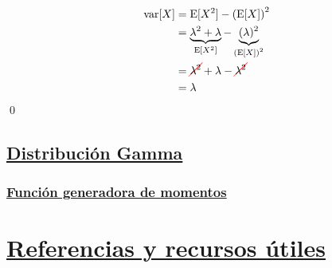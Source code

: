\documentclass[8pt]{article}
\newcommand{\Cancel}[2][black]{{\color{#1}\cancel{\color{black}#2}}} %
\begin{document}
\begin{align*}
    \text{var}[X] &= \text{E}[X^2] - \left(\text{E}[X]\right)^2 \\
    &= \underbrace{\lambda^2 + \lambda}_{\text{E}[X^2]} - \underbrace{(\lambda)^2}_{\left(\text{E}[X]\right)^2} \\
    &= \Cancel[red]{\lambda^2} + \lambda - \Cancel[red]{\lambda^2 }\\
    &= \lambda
\end{align*}\qed

\subsection*{\hyperref[subsec:distribucion_gamma_tag]{Distribución Gamma}}
\label{subsec:distribucion_gamma}

\subsubsection*{\hyperref[subsec:funciongeneradora_gamma_tag]{Función generadora de momentos}}







\section*{\hyperref[paragraph:assets_tag]{Referencias y recursos útiles}}
\label{paragraph:assets}
\end{document}
